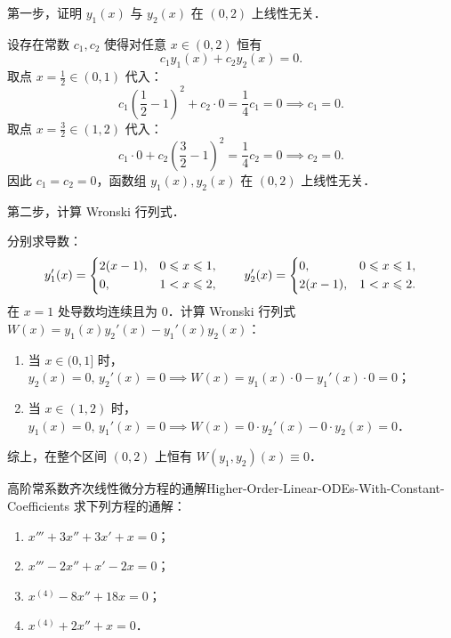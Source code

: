 \begin{myproof}
    第一步，证明 $y_1(x)$ 与 $y_2(x)$ 在 $(0, 2)$ 上线性无关．

    设存在常数 $c_1, c_2$ 使得对任意 $x \in (0, 2)$ 恒有
    \begin{equation}
        c_1 y_1(x) + c_2 y_2(x) = 0.
    \end{equation}
    取点 $x = \frac{1}{2} \in (0, 1)$ 代入：
    \begin{equation}
        c_1 \left(\frac{1}{2} - 1\right)^2 + c_2 \cdot 0 = \frac{1}{4}c_1 = 0 \implies c_1 = 0.
    \end{equation}
    取点 $x = \frac{3}{2} \in (1, 2)$ 代入：
    \begin{equation}
        c_1 \cdot 0 + c_2 \left(\frac{3}{2} - 1\right)^2 = \frac{1}{4}c_2 = 0 \implies c_2 = 0.
    \end{equation}
    因此 $c_1 = c_2 = 0$，函数组 $y_1(x), y_2(x)$ 在 $(0, 2)$ 上线性无关．

    第二步，计算 Wronski 行列式．

    分别求导数：
    \begin{equation}
        y_1'(x) = \begin{dcases} 2(x-1), & 0 \leqslant x \leqslant 1, \\ 0, & 1 < x \leqslant 2, \end{dcases} \qquad y_2'(x) = \begin{dcases} 0, & 0 \leqslant x \leqslant 1, \\ 2(x-1), & 1 < x \leqslant 2. \end{dcases}
    \end{equation}
    在 $x = 1$ 处导数均连续且为 $0$．计算 Wronski 行列式 $W(x) = y_1(x)y_2'(x) - y_1'(x)y_2(x)$：
    \begin{enumerate}
        \item 当 $x \in (0, 1]$ 时，$y_2(x) = 0, \, y_2'(x) = 0 \implies W(x) = y_1(x) \cdot 0 - y_1'(x) \cdot 0 = 0$；
        \item 当 $x \in (1, 2)$ 时，$y_1(x) = 0, \, y_1'(x) = 0 \implies W(x) = 0 \cdot y_2'(x) - 0 \cdot y_2(x) = 0$．
    \end{enumerate}
    综上，在整个区间 $(0, 2)$ 上恒有 $W(y_1, y_2)(x) \equiv 0$．
\end{myproof}

\begin{problem}{高阶常系数齐次线性微分方程的通解}{Higher-Order-Linear-ODEs-With-Constant-Coefficients}
    求下列方程的通解：
    \begin{enumerate}
        \item $x''' + 3x'' + 3x' + x = 0$；
        \item $x''' - 2x'' + x' - 2x = 0$；
        \item $x^{(4)} - 8x'' + 18x = 0$；
        \item $x^{(4)} + 2x'' + x = 0$．
    \end{enumerate}
\end{problem}

